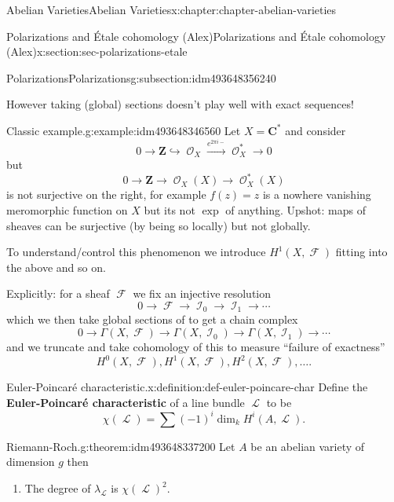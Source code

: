 \documentclass[oneside,10pt,]{book}
\newcommand{\terminology}[1]{\textbf{#1}}
\numberwithin{equation}{section}
\newcommand{\sheaf}[1]{\operatorname{\mathcal{#1}}}
\newcommand{\ZZ}{\mathbf{Z}}
\newcommand{\CC}{\mathbf{C}}
\begin{document}
\begin{chapterptx}{Abelian Varieties}{}{Abelian Varieties}{}{}{x:chapter:chapter-abelian-varieties}
\begin{sectionptx}{Polarizations and Étale cohomology (Alex)}{}{Polarizations and Étale cohomology (Alex)}{}{}{x:section:sec-polarizations-etale}
\begin{subsectionptx}{Polarizations}{}{Polarizations}{}{}{g:subsection:idm493648356240}
\par
However taking (global) sections doesn't play well with exact sequences!%
\begin{example}{Classic example.}{g:example:idm493648346560}%
Let \(X = \CC^*\) and consider%
\begin{equation*}
0 \to \ZZ \hookrightarrow \sheaf O_X \xrightarrow{e^{2\pi i -}} \sheaf O_X^* \to 0
\end{equation*}
but%
\begin{equation*}
0 \to \ZZ \to \sheaf O_X(X) \to \sheaf O_X^*(X)
\end{equation*}
is not surjective on the right, for example \(f(z) = z\) is a nowhere vanishing meromorphic function on \(X\) but its not \(\exp\) of anything. Upshot: maps of sheaves can be surjective (by being so locally) but not globally.%
\end{example}
To understand\slash{}control this phenomenon we introduce \(H^1(X, \sheaf F)\) fitting into the above and so on.%
\par
Explicitly: for a sheaf \(\sheaf F\) we fix an injective resolution%
\begin{equation*}
0\to \sheaf F \to \sheaf I_0 \to \sheaf I_1 \to \cdots
\end{equation*}
which we then take global sections of to get a chain complex%
\begin{equation*}
0\to \Gamma(X,\sheaf F) \to \Gamma(X,\sheaf I_0) \to \Gamma(X,\sheaf I_1) \to \cdots
\end{equation*}
and we truncate and take cohomology of this to measure ``failure of exactness''%
\begin{equation*}
H^0(X, \sheaf F) , H^1(X, \sheaf F) , H^2(X, \sheaf F) , \ldots\text{.}
\end{equation*}
%
\begin{definition}{Euler-Poincaré characteristic.}{x:definition:def-euler-poincare-char}%
Define the \terminology{Euler-Poincaré characteristic} of a line bundle \(\sheaf L\) to be%
\begin{equation*}
\chi(\sheaf L) = \sum (-1)^i \dim_k H^i(A,\sheaf L)\text{.}
\end{equation*}
%
\end{definition}
\begin{theorem}{Riemann-Roch.}{}{g:theorem:idm493648337200}%
Let \(A\) be an abelian variety of dimension \(g\) then%
\begin{enumerate}
\item{}The degree of \(\lambda_{\sheaf L}\) is \(\chi(\sheaf L)^2\).%

\end{enumerate}
\end{theorem}
\end{subsectionptx}
\end{sectionptx}
\end{chapterptx}
\end{document}
